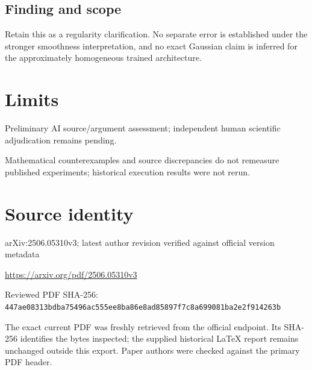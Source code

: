 \documentclass[11pt]{article}
\begin{document}
\subsection*{Finding and scope}

Retain this as a regularity clarification. No separate error is established under the stronger smoothness interpretation, and no exact Gaussian claim is inferred for the approximately homogeneous trained architecture.

\section*{Limits}

Preliminary AI source/argument assessment; independent human scientific adjudication remains pending.\par

Mathematical counterexamples and source discrepancies do not remeasure published experiments; historical execution results were not rerun.\par

\section*{Source identity}

arXiv:2506.05310v3; latest author revision verified against official version metadata

\url{https://arxiv.org/pdf/2506.05310v3}

Reviewed PDF SHA-256: \nolinkurl{447ae08313bdba75496ac555ee8ba86e8ad85897f7c8a699081ba2e2f914263b}

The exact current PDF was freshly retrieved from the official endpoint. Its SHA-256 identifies the bytes inspected; the supplied historical LaTeX report remains unchanged outside this export. Paper authors were checked against the primary PDF header.
\end{document}
